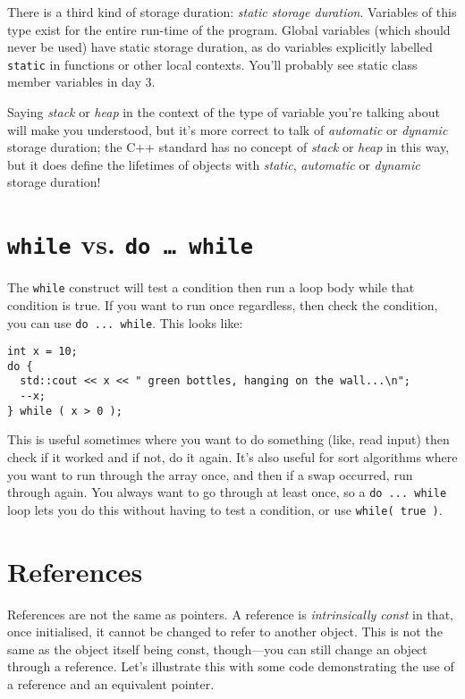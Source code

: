 \documentclass[a4paper]{scrartcl}
\begin{document}
There is a third kind of storage duration: \emph{static storage duration}. Variables of this type exist for the entire run-time of the program. Global variables (which should never be used) have static storage duration, as do variables explicitly labelled \verb|static| in functions or other local contexts. You'll probably see static class member variables in day 3.

Saying \emph{stack} or \emph{heap} in the context of the type of variable you're talking about will make you understood, but it's more correct to talk of \emph{automatic} or \emph{dynamic} storage duration; the C++ standard has no concept of \emph{stack} or \emph{heap} in this way, but it does define the lifetimes of objects with \emph{static}, \emph{automatic} or \emph{dynamic} storage duration!

\section{\texttt{while} vs. \texttt{do \ldots\ while}}
The \verb|while| construct will test a condition then run a loop body while that condition is true. If you want to run once regardless, then check the condition, you can use \verb|do ... while|. This looks like:

\begin{verbatim}
int x = 10;
do {
  std::cout << x << " green bottles, hanging on the wall...\n";
  --x;
} while ( x > 0 );
\end{verbatim}

This is useful sometimes where you want to do something (like, read input) then check if it worked and if not, do it again. It's also useful for sort algorithms where you want to run through the array once, and then if a swap occurred, run through again. You always want to go through at least once, so a \verb|do ... while| loop lets you do this without having to test a condition, or use \verb|while( true )|.

\section{References}
References are not the same as pointers. A reference is \emph{intrinsically const} in that, once initialised, it cannot be changed to refer to another object. This is not the same as the object itself being const, though---you can still change an object through a reference. Let's illustrate this with some code demonstrating the use of a reference and an equivalent pointer.
\end{document}
